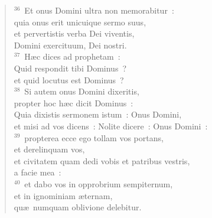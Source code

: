 \begin{flushleft}
\begin{verse}
${}^{36}$~Et onus Domini ultra non memorabitur~:\\ quia onus erit unicuique sermo suus,\\ et pervertistis verba Dei viventis,\\ Domini exercituum, Dei nostri.\\
${}^{37}$~H\ae c dices ad prophetam~:\\ Quid respondit tibi Dominus~?\\ et quid locutus est Dominus~?\\
${}^{38}$~Si autem onus Domini dixeritis,\\ propter hoc h\ae c dicit Dominus~:\\ Quia dixistis sermonem istum~: Onus Domini,\\ et misi ad vos dicens~: Nolite dicere~: Onus Domini~:\\
${}^{39}$~propterea ecce ego tollam vos portans,\\ et derelinquam vos,\\ et civitatem quam dedi vobis et patribus vestris,\\ a facie mea~:\\
${}^{40}$~et dabo vos in opprobrium sempiternum,\\ et in ignominiam \ae ternam,\\ qu\ae\ numquam oblivione delebitur.\end{verse}\end{flushleft}



